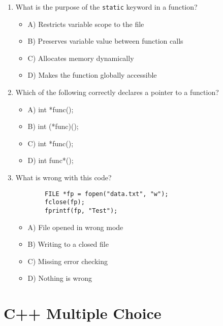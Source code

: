 \documentclass[a4paper,12pt]{article}
\begin{document}
\begin{enumerate}
    \item What is the purpose of the \verb|static| keyword in a function?
    \begin{itemize}
        \item A) Restricts variable scope to the file
        \item B) Preserves variable value between function calls
        \item C) Allocates memory dynamically
        \item D) Makes the function globally accessible
    \end{itemize}

    \item Which of the following correctly declares a pointer to a function?
    \begin{itemize}
        \item A) int *func();
        \item B) int (*func)();
        \item C) int *func();
        \item D) int func*();
    \end{itemize}

    \item What is wrong with this code?

    \lstset{language=C}
    \begin{lstlisting}
        FILE *fp = fopen("data.txt", "w");
        fclose(fp);
        fprintf(fp, "Test");
    \end{lstlisting}
    
    \begin{itemize}
        \item A) File opened in wrong mode
        \item B) Writing to a closed file
        \item C) Missing error checking
        \item D) Nothing is wrong
    \end{itemize}
\end{enumerate}

\newpage

\section{C++ Multiple Choice}
\end{document}
